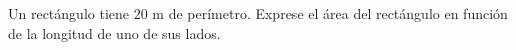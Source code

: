 \setcounter{enumi}{70}
    \item Un rectángulo tiene $20\text{ m}$ de perímetro. Exprese el área del rectángulo en función de la longitud de uno de sus lados.
